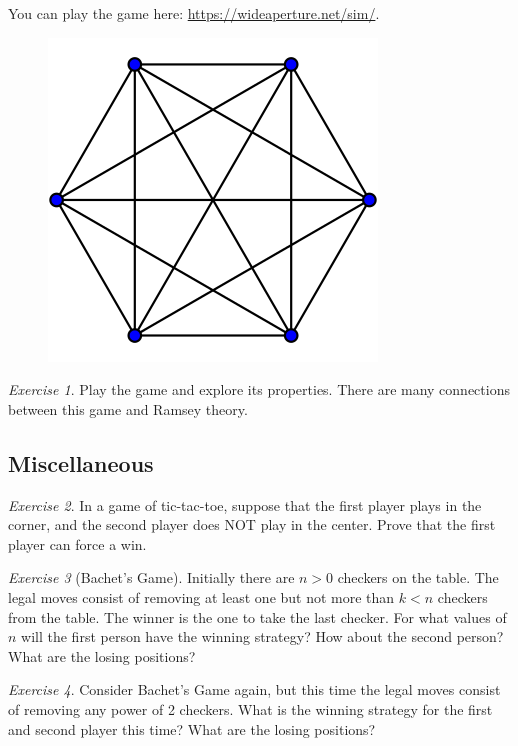 \documentclass{article}
\theoremstyle{definition}
\theoremstyle{remark}
\newtheorem{exercise}{Exercise}
\begin{document}
    You can play the game here: \url{https://wideaperture.net/sim/}.

    \begin{figure}[hbt!]
        \small
        \centering
        \includegraphics[scale = 0.4]{Pics/sim.png}
    \end{figure}

    \begin{exercise}
        Play the game and explore its properties.
        There are many connections between this game and Ramsey theory.
    \end{exercise}

\subsection{Miscellaneous}

    \begin{exercise}
        In a game of tic-tac-toe, suppose that the first player plays in the corner, and the second player does NOT play in the center.
        Prove that the first player can force a win.
    \end{exercise}

    \begin{exercise}[Bachet's Game]
        Initially there are \(n>0\) checkers on the table.
        The legal moves consist of removing at least one but not more than \(k<n\) checkers from the table.
        The winner is the one to take the last checker.
        For what values of \(n\) will the first person have the winning strategy?
        How about the second person?
        What are the losing positions?
    \end{exercise}

    \begin{exercise}
        Consider Bachet's Game again, but this time the legal moves consist of removing any power of 2 checkers.
        What is the winning strategy for the first and second player this time?
        What are the losing positions?
    \end{exercise}
\end{document}
